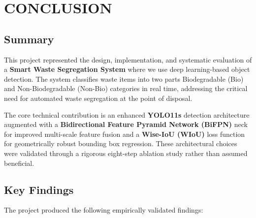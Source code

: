 \chapter{CONCLUSION}

\section{Summary}

This project represented the design, implementation, and systematic evaluation of a \textbf{Smart Waste Segregation System} where we use deep learning-based object detection. The system classifies waste items into two parts  Biodegradable (Bio) and Non-Biodegradable (Non-Bio) categories in real time, addressing the critical need for automated waste segregation at the point of disposal.

The core technical contribution is an enhanced \textbf{YOLO11s} detection architecture augmented with a \textbf{Bidirectional Feature Pyramid Network (BiFPN)} neck for improved multi-scale feature fusion and a \textbf{Wise-IoU (WIoU)} loss function for geometrically robust bounding box regression. These architectural choices were validated through a rigorous eight-step ablation study rather than assumed beneficial.

\section{Key Findings}

The project produced the following empirically validated findings:

